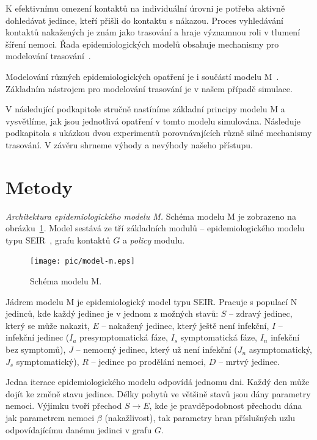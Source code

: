 K efektivnímu omezení kontaktů na individuální úrovni je potřeba
aktivně dohledávat jedince, kteří přišli do kontaktu s nákazou. Proces
vyhledávání kontaktů nakažených je znám jako trasování a hraje
významnou roli v tlumení šíření nemoci. Řada epidemiologických modelů
obsahuje mechanismy pro modelování
trasování~\cite{pg:mooney2020,pg:kucharski2020,pg:Kerr2020,pg:keeling2020,pg:bilinski2020}.

Modelování různých epidemiologických opatření je i součástí 
modelu M~\cite{pg:modelM}. Základním nástrojem pro modelování trasování je v našem případě simulace.

V následující podkapitole stručně nastíníme základní principy modelu M
a vysvětlíme, jak jsou jednotlivá opatření v tomto modelu
simulována. Následuje podkapitola s ukázkou dvou experimentů
porovnávajících různě silné mechanismy trasování. V závěru shrneme
výhody a nevýhody našeho přístupu.

\section*{Metody}

\emph{Architektura epidemiologického modelu M.} Schéma modelu M je zobrazeno na obrázku~\ref{pg:fig:mm}. Model sestává ze
tří základních modulů -- epidemiologického modelu typu
SEIR~\cite{pg:bailey1975}, grafu kontaktů $G$ a {\em policy} modulu.

\begin{figure}[h]
  \centering
  \texttt{[image: pic/model-m.eps]}
  \caption{Schéma modelu M.}
  \label{pg:fig:mm}
\end{figure}



Jádrem modelu M je epidemiologický model typu SEIR. Pracuje s populací N
jedinců, kde každý jedinec je v jednom z možných stavů: $S$ -- zdravý jedinec,
který se může nakazit, $E$ -- nakažený jedinec, který ještě není infekční, $I$ --
infekční jedinec ($I_a$ presymptomatická fáze, $I_s$ symptomatická fáze, $I_n$
infekční bez symptomů),  $J$ -- nemocný jedinec, který už není infekční ($J_n$
asymptomatický, $J_s$ symptomatický), $R$ -- jedinec po prodělání nemoci, $D$ --
mrtvý jedinec.

Jedna iterace epidemiologického modelu odpovídá jednomu dni. Každý den
může dojít ke změně stavu jedince. Délky pobytů ve většině stavů jsou
dány parametry nemoci. Výjimku tvoří přechod $S \rightarrow E$, kde
je pravděpodobnost přechodu dána jak parametrem nemoci $\beta$
(nakažlivost), tak parametry hran příslušných uzlu odpovídajícímu
danému jedinci v grafu $G$.

